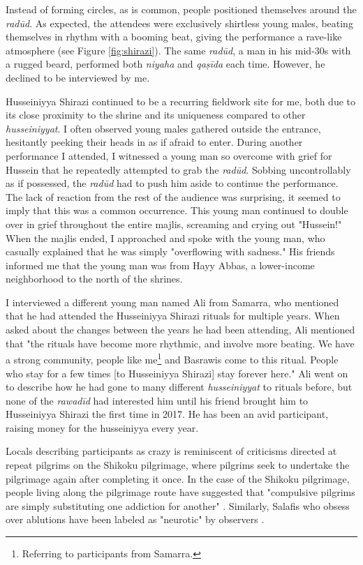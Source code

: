 Instead of forming circles, as is common, people positioned themselves around the \emph{radūd}. As expected, the attendees were exclusively shirtless young males, beating themselves in rhythm with a booming beat, giving the performance a rave-like atmosphere (see Figure \ref{fig:shirazi}). The same \emph{radūd}, a man in his mid-30s with a rugged beard, performed both \emph{niyaha} and \emph{qaṣīda} each time. However, he declined to be interviewed by me.

Husseiniyya Shirazi continued to be a recurring fieldwork site for me, both due to its close proximity to the shrine and its uniqueness compared to other \emph{husseiniyyat}. I often observed young males gathered outside the entrance, hesitantly peeking their heads in as if afraid to enter. During another performance I attended, I witnessed a young man so overcome with grief for Hussein that he repeatedly attempted to grab the \emph{radūd}. Sobbing uncontrollably as if possessed, the \emph{radūd} had to push him aside to continue the performance. The lack of reaction from the rest of the audience was surprising, it seemed to imply that this was a common occurrence. This young man continued to double over in grief throughout the entire majlis, screaming and crying out "Hussein!" When the majlis ended, I approached and spoke with the young man, who casually explained that he was simply "overflowing with sadness." His friends informed me that the young man was from Hayy Abbas, a lower-income neighborhood to the north of the shrines.

I interviewed a different young man named Ali from Samarra, who mentioned that he had attended the Husseiniyya Shirazi rituals for multiple years. When asked about the changes between the years he had been attending, Ali mentioned that "the rituals have become more rhythmic, and involve more beating. We have a strong community, people like me\footnote{Referring to participants from Samarra.} and Basrawis come to this ritual. People who stay for a few times [to Husseiniyya Shirazi] stay forever here." Ali went on to describe how he had gone to many different \emph{husseiniyyat} to rituals before, but none of the \emph{rawadīd} had interested him until his friend brought him to Husseiniyya Shirazi the first time in 2017. He has been an avid participant, raising money for the husseiniyya every year. 

Locals describing participants as crazy is reminiscent of criticisms directed at repeat pilgrims on the Shikoku pilgrimage, where pilgrims seek to undertake the pilgrimage again after completing it once. In the case of the Shikoku pilgrimage, people living along the pilgrimage route have suggested that "compulsive pilgrims are simply substituting one addiction for another" \cite{reader_pilgrims_2021}. Similarly, Salafis who obsess over ablutions have been labeled as "neurotic" by observers \cite[67]{gauvain_salafi_2013}.

